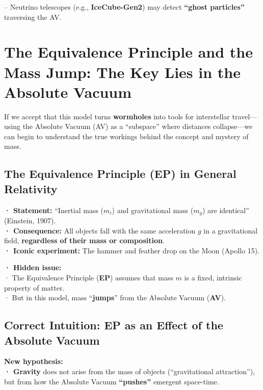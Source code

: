 \documentclass[a4paper]{article}
\theoremstyle{definition}
\theoremstyle{remark}
\numberwithin{equation}{section}
\begin{document}
– Neutrino telescopes (e.g., \textbf{IceCube-Gen2}) may detect \textbf{``ghost particles''} traversing the AV.

	
	\section{The Equivalence Principle and the Mass Jump: The Key Lies in the Absolute Vacuum}
	
	If we accept that this model turns \textbf{wormholes} into tools for interstellar travel—using the Absolute Vacuum (AV) as a ``subspace'' where distances collapse—we can begin to understand the true workings behind the concept and mystery of mass.
	
	\subsection{The Equivalence Principle (EP) in General Relativity}
	
	\textbf{· Statement:} ``Inertial mass (\(m_i\)) and gravitational mass (\(m_g\)) are identical'' (Einstein, 1907).\\
	
	\textbf{· Consequence:} All objects fall with the same acceleration \(g\) in a gravitational field, \textbf{regardless of their mass or composition}.\\
	
	\textbf{· Iconic experiment:} The hammer and feather drop on the Moon (Apollo 15).
	
	\textbf{· Hidden issue:}\\
	
	· The Equivalence Principle (\textbf{EP}) assumes that mass \(m\) is a fixed, intrinsic property of matter.\\
	
	· But in this model, mass ``\textbf{jumps}'' from the Absolute Vacuum (\textbf{AV}).
	
	\subsection{Correct Intuition: EP as an Effect of the Absolute Vacuum}
	
	\textbf{New hypothesis:}\\
	
	\textbf{· Gravity} does not arise from the mass of objects (``gravitational attraction''), but from how the Absolute Vacuum \textbf{``pushes''} emergent space-time.\\
	
\end{document}
